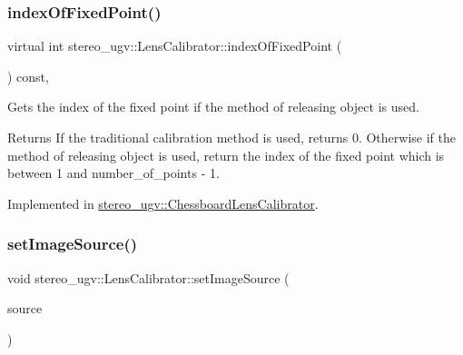 \mbox{\label{classstereo__ugv_1_1LensCalibrator_ad25267d7b60a912f270701359eda1c54}} 
\subsubsection{\texorpdfstring{index\+Of\+Fixed\+Point()}{indexOfFixedPoint()}}
{\footnotesize\ttfamily virtual int stereo\+\_\+ugv\+::\+Lens\+Calibrator\+::index\+Of\+Fixed\+Point (\begin{DoxyParamCaption}{ }\end{DoxyParamCaption}) const\hspace{0.3cm}{\ttfamily [protected]}, {}}



Gets the index of the fixed point if the method of releasing object is used. 

\begin{DoxyReturn}{Returns}
If the traditional calibration method is used, returns 0. Otherwise if the method of releasing object is used, return the index of the fixed point which is between 1 and number\+\_\+of\+\_\+points -\/ 1. 
\end{DoxyReturn}


Implemented in \hyperlink{classstereo__ugv_1_1ChessboardLensCalibrator_a00aa88f3399b59ec686f6d506c73a910}{stereo\+\_\+ugv\+::\+Chessboard\+Lens\+Calibrator}.

\mbox{\label{classstereo__ugv_1_1LensCalibrator_a13c279f4c0a4cc7b815340e31d5447be}} 
\subsubsection{\texorpdfstring{set\+Image\+Source()}{setImageSource()}}
{\footnotesize\ttfamily void stereo\+\_\+ugv\+::\+Lens\+Calibrator\+::set\+Image\+Source (\begin{DoxyParamCaption}\item[{std\+::unique\+\_\+ptr$<$ \hyperlink{classstereo__ugv_1_1ImageSource}{Image\+Source} $>$ \&\&}]{source }\end{DoxyParamCaption})}



